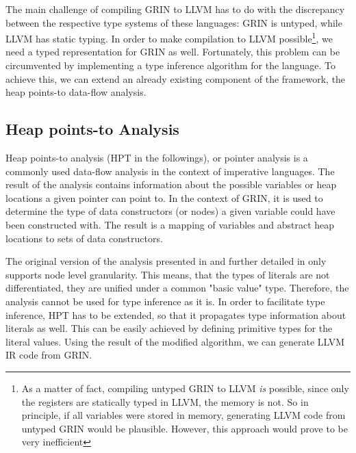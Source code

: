 \documentclass[main.tex]{subfiles}
\begin{document}
	The main challenge of compiling GRIN to LLVM has to do with the discrepancy between the respective type systems of these languages: GRIN is untyped, while LLVM has static typing. In order to make compilation to LLVM possible\footnote{As a matter of fact, compiling untyped GRIN to LLVM \emph{is} possible, since only the registers are statically typed in LLVM, the memory is not. So in principle, if all variables were stored in memory, generating LLVM code from untyped GRIN would be plausible. However, this approach would prove to be very inefficient}, we need a typed representation for GRIN as well. Fortunately, this problem can be circumvented by implementing a type inference algorithm for the language. To achieve this, we can extend an already existing component of the framework, the heap points-to data-flow analysis.
	
	\subsection{Heap points-to Analysis}
	
	Heap points-to analysis (HPT in the followings), or pointer analysis is a commonly used data-flow analysis in the context of imperative languages. The result of the analysis contains information about the possible variables or heap locations a given pointer can point to. In the context of GRIN, it is used to determine the type of data constructors (or nodes) a given variable could have been constructed with. The result is a mapping of variables and abstract heap locations to sets of data constructors.
	
	
	The original version of the analysis presented in \cite{boquist-phd} and further detailed in \cite{boquist-grin} only supports node level granularity. This means, that the types of literals are not differentiated, they are unified under a common "basic value" type. Therefore, the analysis cannot be used for type inference as it is. In order to facilitate type inference, HPT has to be extended, so that it propagates type information about literals as well. This can be easily achieved by defining primitive types for the literal values. Using the result of the modified algorithm, we can generate LLVM IR code from GRIN.
	
	
\end{document}
